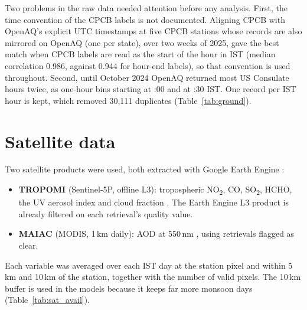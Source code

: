 Two problems in the raw data needed attention before any analysis. First, the time convention of
the CPCB labels is not documented. Aligning CPCB with OpenAQ's explicit UTC timestamps at five
CPCB stations whose records are also mirrored on OpenAQ (one per state), over two weeks of 2025, gave the best match when CPCB labels are read as the start of the
hour in IST (median correlation 0.986, against 0.944 for hour-end labels), so that convention is
used throughout. Second, until October 2024 OpenAQ returned most US Consulate hours twice, as
one-hour bins starting at :00 and at :30 IST. One record per IST hour is kept, which removed 30,111
duplicates (Table~\ref{tab:ground}).

\section{Satellite data}

Two satellite products were used, both extracted with Google Earth Engine \cite{gorelick2017gee}:

\begin{itemize}
  \item \textbf{TROPOMI} (Sentinel-5P, offline L3): tropospheric NO\textsubscript{2}, CO,
        SO\textsubscript{2}, HCHO, the UV aerosol index and cloud fraction
        \cite{veefkind2012tropomi}. The Earth Engine L3 product is already filtered on each
        retrieval's quality value.
  \item \textbf{MAIAC} (MODIS, 1\,km daily): AOD at 550\,nm \cite{lyapustin2018maiac}, using
        retrievals flagged as clear.
\end{itemize}

Each variable was averaged over each IST day at the station pixel and within 5\,km and 10\,km of
the station, together with the number of valid pixels. The 10\,km buffer is used in the models
because it keeps far more monsoon days (Table~\ref{tab:sat_avail}).

